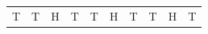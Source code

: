 {{\begin{center}
\begin{xtabular}[t]{|l|l|l|l|l|l|l|l|l|l|}
    
        T &
    
    
        T &
    
    
        H &
    
    
        T &
    
    
        T &
    
    
        H &
    
    
        T &
    
    
        T &
    
    
        H &
    
    
        T%
     \tabularnewline{}
    

\end{xtabular}
\end{center}}}
